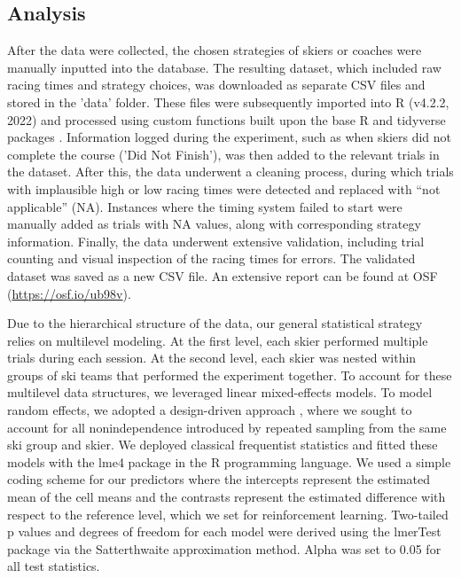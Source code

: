 \documentclass[pdflatex,sn-mathphys-num]{sn-jnl}%
\theoremstyle{thmstyleone}%
\theoremstyle{thmstyletwo}%
\theoremstyle{thmstylethree}%
\begin{document}
\subsection{Analysis}

After the data were collected, the chosen strategies of skiers or coaches were manually inputted into the database. The resulting dataset, which included raw racing times and strategy choices, was downloaded as separate CSV files and stored in the 'data' folder. These files were subsequently imported into R (v4.2.2, 2022) and processed using custom functions built upon the base R and tidyverse\cite{wickham_package_2017} packages . Information logged during the experiment, such as when skiers did not complete the course ('Did Not Finish'), was then added to the relevant trials in the dataset. After this, the data underwent a cleaning process, during which trials with implausible high or low racing times were detected and replaced with “not applicable” (NA). Instances where the timing system failed to start were manually added as trials with NA values, along with corresponding strategy information. Finally, the data underwent extensive validation, including trial counting and visual inspection of the racing times for errors. The validated dataset was saved as a new CSV file. An extensive report can be found at OSF (\url{https://osf.io/ub98v}).

Due to the hierarchical structure of the data, our general statistical strategy relies on multilevel modeling. At the first level, each skier performed multiple trials during each session. At the second level, each skier was nested within groups of ski teams that performed the experiment together. To account for these multilevel data structures, we leveraged linear mixed-effects models. To model random effects, we adopted a design-driven approach \cite{barr_random_2013, barr_learning_2021}, where we sought to account for all nonindependence introduced by repeated sampling from the same ski group and skier. We deployed classical frequentist statistics and fitted these models with the lme4 package \cite{bates_fitting_2015} in the R programming language. We used a simple coding scheme for our predictors where the intercepts represent the estimated mean of the cell means and the contrasts represent the estimated difference with respect to the reference level, which we set for reinforcement learning. Two-tailed p values and degrees of freedom for each model were derived using the lmerTest package \cite{kuznetsova_lmertest_2017} via the Satterthwaite approximation method. Alpha was set to 0.05 for all test statistics.
\end{document}
